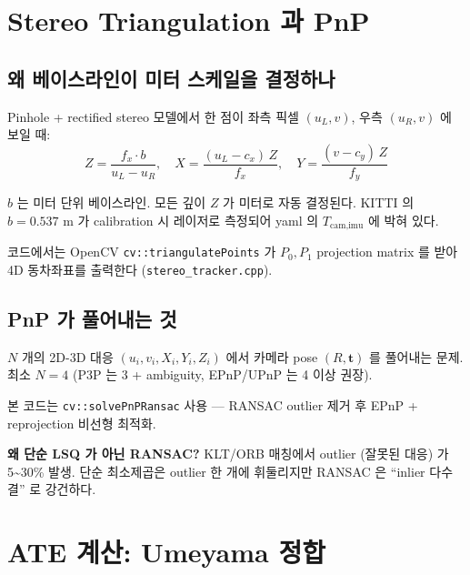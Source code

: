 \documentclass[11pt,a4paper,oneside]{report}
\begin{document}
\section{Stereo Triangulation 과 PnP}

\subsection{왜 베이스라인이 미터 스케일을 결정하나}

Pinhole + rectified stereo 모델에서 한 점이 좌측 픽셀 \((u_L, v)\), 우측 \((u_R, v)\) 에 보일 때:
\begin{equation}
Z = \frac{f_x \cdot b}{u_L - u_R}, \quad X = \frac{(u_L - c_x) \, Z}{f_x}, \quad Y = \frac{(v - c_y) \, Z}{f_y}
\end{equation}

\(b\) 는 미터 단위 베이스라인. 모든 깊이 \(Z\) 가 미터로 자동 결정된다. KITTI 의 \(b = 0.537\) m 가 calibration 시 레이저로 측정되어 yaml 의 \(T_{\text{cam,imu}}\) 에 박혀 있다.

코드에서는 OpenCV \texttt{cv::triangulatePoints} 가 \(P_0, P_1\) projection matrix 를 받아 4D 동차좌표를 출력한다 (\texttt{stereo\_tracker.cpp}).

\subsection{PnP 가 풀어내는 것}

\(N\) 개의 2D-3D 대응 \((u_i, v_i, X_i, Y_i, Z_i)\) 에서 카메라 pose \((R, \bm{t})\) 를 풀어내는 문제. 최소 \(N = 4\) (P3P 는 3 + ambiguity, EPnP/UPnP 는 4 이상 권장).

본 코드는 \texttt{cv::solvePnPRansac} 사용 — RANSAC outlier 제거 후 EPnP + reprojection 비선형 최적화.

\textbf{왜 단순 LSQ 가 아닌 RANSAC?} KLT/ORB 매칭에서 outlier (잘못된 대응) 가 5\textasciitilde{}30\% 발생. 단순 최소제곱은 outlier 한 개에 휘둘리지만 RANSAC 은 ``inlier 다수결'' 로 강건하다.

\section{ATE 계산: Umeyama 정합}
\end{document}
